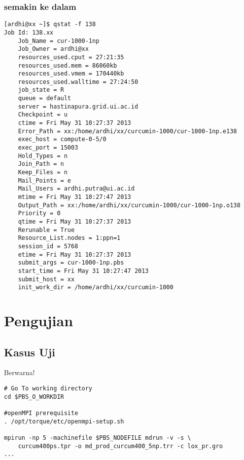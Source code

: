 \subsubsection{semakin ke dalam}
\begin{minipage}{\linewidth}
\begin{lstlisting}[caption={Keluaran mentah untuk detail \f{job}}, label={lst:outqstatf},style=L]
[ardhi@xx ~]$ qstat -f 138
Job Id: 138.xx
    Job_Name = cur-1000-1np
    Job_Owner = ardhi@xx
    resources_used.cput = 27:21:35
    resources_used.mem = 86060kb
    resources_used.vmem = 170440kb
    resources_used.walltime = 27:24:50
    job_state = R
    queue = default
    server = hastinapura.grid.ui.ac.id
    Checkpoint = u
    ctime = Fri May 31 10:27:37 2013
    Error_Path = xx:/home/ardhi/xx/curcumin-1000/cur-1000-1np.e138
    exec_host = compute-0-5/0
    exec_port = 15003
    Hold_Types = n
    Join_Path = n
    Keep_Files = n
    Mail_Points = e
    Mail_Users = ardhi.putra@ui.ac.id
    mtime = Fri May 31 10:27:47 2013
    Output_Path = xx:/home/ardhi/xx/curcumin-1000/cur-1000-1np.o138
    Priority = 0
    qtime = Fri May 31 10:27:37 2013
    Rerunable = True
    Resource_List.nodes = 1:ppn=1
    session_id = 5768
    etime = Fri May 31 10:27:37 2013
    submit_args = cur-1000-1np.pbs
    start_time = Fri May 31 10:27:47 2013
    submit_host = xx
    init_work_dir = /home/ardhi/xx/curcumin-1000   
\end{lstlisting}
\end{minipage}

\section{Pengujian} %

\subsection{Kasus Uji}
Berwarna!
\begin{lstlisting}[caption=Potongan skrip submisi \f{job} melalui torqace,label={lst:grotorqace},style=shell]
# Go To working directory
cd $PBS_O_WORKDIR

#openMPI prerequisite
. /opt/torque/etc/openmpi-setup.sh

mpirun -np 5 -machinefile $PBS_NODEFILE mdrun -v -s \ 
	curcum400ps.tpr -o md_prod_curcum400_5np.trr -c lox_pr.gro
...
\end{lstlisting}
